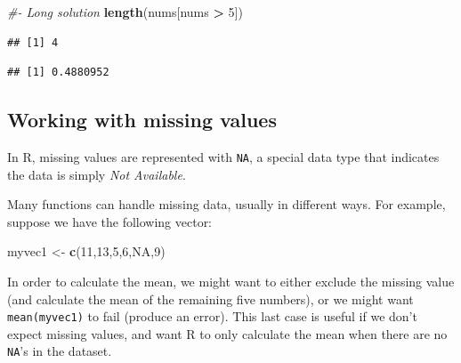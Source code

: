 \documentclass[]{book}
\newenvironment{Shaded}{\begin{snugshade}}{\end{snugshade}}
\newcommand{\CommentTok}[1]{\textcolor[rgb]{0.56,0.35,0.01}{\textit{#1}}}
\newcommand{\DecValTok}[1]{\textcolor[rgb]{0.00,0.00,0.81}{#1}}
\newcommand{\FloatTok}[1]{\textcolor[rgb]{0.00,0.00,0.81}{#1}}
\newcommand{\KeywordTok}[1]{\textcolor[rgb]{0.13,0.29,0.53}{\textbf{#1}}}
\newcommand{\NormalTok}[1]{#1}
\newcommand{\OperatorTok}[1]{\textcolor[rgb]{0.81,0.36,0.00}{\textbf{#1}}}
\newcommand{\OtherTok}[1]{\textcolor[rgb]{0.56,0.35,0.01}{#1}}
\newcommand{\StringTok}[1]{\textcolor[rgb]{0.31,0.60,0.02}{#1}}
\begin{document}
\begin{Shaded}
\begin{Highlighting}[]
\CommentTok{#- Long solution}
\KeywordTok{length}\NormalTok{(nums[nums }\OperatorTok{>}\StringTok{ }\DecValTok{5}\NormalTok{])}
\end{Highlighting}
\end{Shaded}

\begin{verbatim}
## [1] 4
\end{verbatim}

\begin{Shaded}
\end{Shaded}

\begin{verbatim}
## [1] 0.4880952
\end{verbatim}

\hypertarget{workingmissing}{%
\subsection{Working with missing values}\label{workingmissing}}

In R, missing values are represented with \texttt{NA}, a special data type that indicates the data is simply \emph{Not Available}.

Many functions can handle missing data, usually in different ways. For example, suppose we have the following vector:

\begin{Shaded}
\begin{Highlighting}[]
\NormalTok{myvec1 <-}\StringTok{ }\KeywordTok{c}\NormalTok{(}\DecValTok{11}\NormalTok{,}\DecValTok{13}\NormalTok{,}\DecValTok{5}\NormalTok{,}\DecValTok{6}\NormalTok{,}\OtherTok{NA}\NormalTok{,}\DecValTok{9}\NormalTok{)}
\end{Highlighting}
\end{Shaded}

In order to calculate the mean, we might want to either exclude the missing value (and calculate the mean of the remaining five numbers), or we might want \texttt{mean(myvec1)} to fail (produce an error). This last case is useful if we don't expect missing values, and want R to only calculate the mean when there are no \texttt{NA}'s in the dataset.
\end{document}
